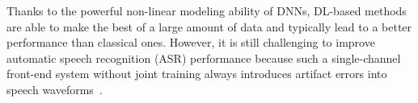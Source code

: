 Thanks to the powerful non-linear modeling ability of DNNs, DL-based methods are able to make the best of a large amount of data and typically lead to a better performance than classical ones.
However, it is still challenging to improve automatic speech recognition (ASR) performance because such a single-channel front-end system without joint training always introduces artifact errors into speech waveforms~\cite{iwamoto22_interspeech,iwamoto2024does}.

